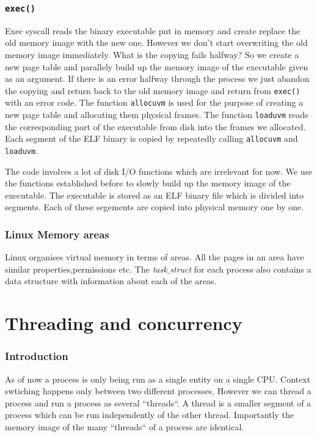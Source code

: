 \documentclass[12pt]{article}
\newcommand{\tbox}[1]{\noindent\fbox{\parbox{\textwidth}{#1}}}
\begin{document}
\section{\texttt{exec()}}
Exec syscall reads the binary executable put in memory and create replace the old memory image with the new one.
However we don't start overwriting the old memory image immediately. What is the copying fails halfway? So we create a new page table and parallely build up the 
memory image of the executable given as an argument. If there is an error halfway through the process we just abandon the copying and return back to the old memory image and return from \texttt{exec()}
with an error code. The function \texttt{allocuvm} is used for the purpose of creating a new page table and allocating them physical frames. The function \texttt{loaduvm} reads the corresponding part of the executable from disk 
into the frames we allocated. Each segment of the ELF binary is copied by repeatedly calling \texttt{allocuvm} and \texttt{loaduvm}. 
 
The code involves a lot of disk I/O functions which are irrelevant for now. We use the functions established before to slowly build up the 
memory image of the executable. The executable is stored as an ELF binary file which is divided into segments. Each of these segements are copied into physical memory one by one.


\section{Linux Memory areas}
Linux organises virtual memory in terms of areas. All the pages in an area have similar properties,permissions etc. 
The \textit{task$\_$struct} for each process also contains a data structure with information about each of the areas.


\newpage
\noindent\tbox{
    \begin{center}
    \textbf{\Huge Lecture 21}
    \end{center}
}
\part{Threading and concurrency}
\section{Introduction}
As of now a process is only being run as a single entity on a single CPU. Context swtiching happens only between two different processes.
However we can thread a process and run a process as several ``threads``. A thread is a smaller segment of a process which can be run independently of the other thread. 
Importantly the memory image of the many ``threads`` of a process are identical.
\end{document}
